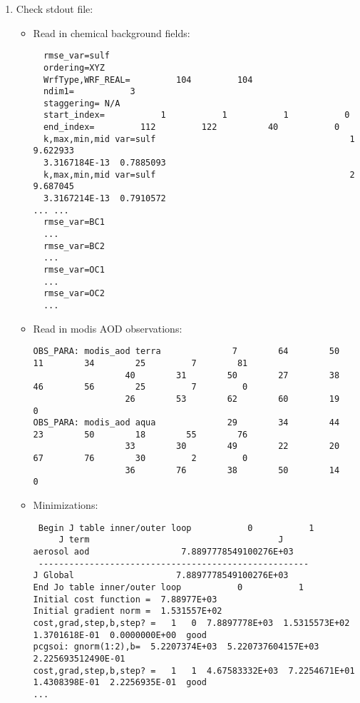 \begin{enumerate}
\item Check stdout file: \\

\begin{itemize}
\item Read in chemical background fields:
\begin{scriptsize}
\begin{verbatim}
  rmse_var=sulf
  ordering=XYZ
  WrfType,WRF_REAL=         104         104
  ndim1=           3
  staggering= N/A
  start_index=           1           1           1           0
  end_index=         112         122          40           0
  k,max,min,mid var=sulf                                      1   9.622933
  3.3167184E-13  0.7885093
  k,max,min,mid var=sulf                                      2   9.687045  
  3.3167214E-13  0.7910572
... ...
  rmse_var=BC1
  ...
  rmse_var=BC2
  ...
  rmse_var=OC1
  ...
  rmse_var=OC2
  ...

\end{verbatim}
\end{scriptsize}

\item Read in modis AOD observations:
\begin{tiny}
\begin{verbatim}
OBS_PARA: modis_aod terra              7        64        50        11        34        25         7        81
                  40        31        50        27        38        46        56        25         7         0
                  26        53        62        60        19         0
OBS_PARA: modis_aod aqua              29        34        44        23        50        18        55        76
                  33        30        49        22        20        67        76        30         2         0
                  36        76        38        50        14         0
\end{verbatim}
\end{tiny}

\item Minimizations:
\begin{scriptsize}
\begin{verbatim}
 Begin J table inner/outer loop           0           1
     J term                                     J
aerosol aod                  7.8897778549100276E+03
 -----------------------------------------------------
J Global                    7.8897778549100276E+03
End Jo table inner/outer loop           0           1
Initial cost function =  7.88977E+03
Initial gradient norm =  1.531557E+02
cost,grad,step,b,step? =   1   0  7.8897778E+03  1.5315573E+02  1.3701618E-01  0.0000000E+00  good
pcgsoi: gnorm(1:2),b=  5.2207374E+03  5.220737604157E+03  2.225693512490E-01
cost,grad,step,b,step? =   1   1  4.67583332E+03  7.2254671E+01  1.4308398E-01  2.2256935E-01  good
...


\end{verbatim}
\end{scriptsize}
\end{itemize}
\end{enumerate}
